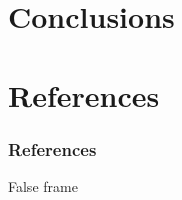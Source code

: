 \documentclass{beamer}
\begin{document}




    \section{Conclusions}

    \section{References}
        \begin{frame}
            \frametitle{References}
            \printbibliography
        \end{frame}


    \begin{frame}
        False frame
    \end{frame}
\end{document}
